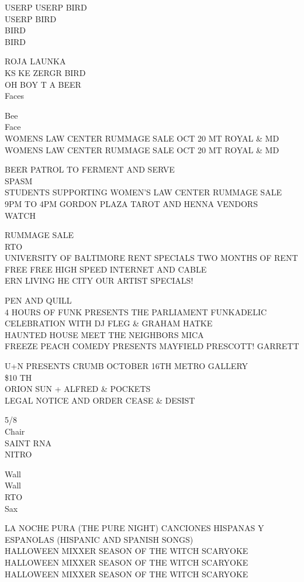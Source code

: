 \documentclass[10pt,letterpaper]{article}
\begin{document}
USERP USERP BIRD\\
USERP BIRD\\
BIRD\\
BIRD

ROJA LAUNKA\\
KS KE ZERGR BIRD\\
OH BOY T A BEER\\
Faces

Bee\\
Face\\
WOMENS LAW CENTER RUMMAGE SALE OCT 20 MT ROYAL \& MD\\
WOMENS LAW CENTER RUMMAGE SALE OCT 20 MT ROYAL \& MD

BEER PATROL TO FERMENT AND SERVE\\
SPASM\\
STUDENTS SUPPORTING WOMEN'S LAW CENTER RUMMAGE SALE 9PM TO 4PM GORDON PLAZA TAROT AND HENNA VENDORS\\
WATCH

RUMMAGE SALE\\
RTO\\
UNIVERSITY OF BALTIMORE RENT SPECIALS TWO MONTHS OF RENT FREE FREE HIGH SPEED INTERNET AND CABLE\\
ERN LIVING HE CITY OUR ARTIST SPECIALS!

PEN AND QUILL\\
4 HOURS OF FUNK PRESENTS THE PARLIAMENT FUNKADELIC CELEBRATION WITH DJ FLEG \& GRAHAM HATKE\\
HAUNTED HOUSE MEET THE NEIGHBORS MICA\\
FREEZE PEACH COMEDY PRESENTS MAYFIELD PRESCOTT!  GARRETT

U+N PRESENTS CRUMB OCTOBER 16TH METRO GALLERY\\
\$10 TH\\
ORION SUN + ALFRED \& POCKETS\\
LEGAL NOTICE AND ORDER CEASE \& DESIST

5/8\\
Chair\\
SAINT RNA\\
NITRO

Wall\\
Wall\\
RTO\\
Sax

LA NOCHE PURA (THE PURE NIGHT) CANCIONES HISPANAS Y ESPANOLAS (HISPANIC AND SPANISH SONGS)\\
HALLOWEEN MIXXER SEASON OF THE WITCH SCARYOKE\\
HALLOWEEN MIXXER SEASON OF THE WITCH SCARYOKE\\
HALLOWEEN MIXXER SEASON OF THE WITCH SCARYOKE
\end{document}
